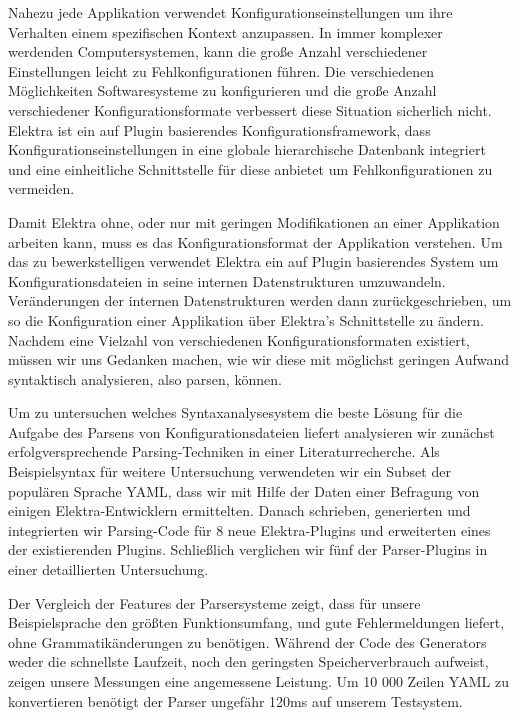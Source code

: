 \begin{kurzfassung}
\begin{sloppypar}
Nahezu jede Applikation verwendet Konfigurationseinstellungen um ihre Verhalten einem spezifischen Kontext anzupassen. In immer komplexer werdenden Computersystemen, kann die große Anzahl verschiedener Einstellungen leicht zu Fehlkonfigurationen führen. Die verschiedenen Möglichkeiten Softwaresysteme zu konfigurieren und die große Anzahl verschiedener Konfigurationsformate verbessert diese Situation sicherlich nicht. Elektra ist ein auf Plugin basierendes Konfigurationsframework, dass Konfigurationseinstellungen in eine globale hierarchische Datenbank integriert und eine einheitliche Schnittstelle für diese anbietet um Fehlkonfigurationen zu vermeiden.
\end{sloppypar}

Damit Elektra ohne, oder nur mit geringen Modifikationen an einer Applikation arbeiten kann, muss es das Konfigurationsformat der Applikation verstehen. Um das zu bewerkstelligen verwendet Elektra ein auf Plugin basierendes System um Konfigurationsdateien in seine internen Datenstrukturen umzuwandeln. Veränderungen der internen Datenstrukturen werden dann zurückgeschrieben, um so die Konfiguration einer Applikation über Elektra’s Schnittstelle zu ändern. Nachdem eine Vielzahl von verschiedenen Konfigurationsformaten existiert, müssen wir uns Gedanken machen, wie wir diese mit möglichst geringen Aufwand syntaktisch analysieren, also parsen, können.

\begin{sloppypar}
Um zu untersuchen welches Syntaxanalysesystem die beste Lösung für die Aufgabe des Parsens von Konfigurationsdateien liefert analysieren wir zunächst  erfolgversprechende Parsing-Techniken in einer Literaturrecherche. Als Beispielsyntax für weitere Untersuchung verwendeten wir ein Subset der populären Sprache YAML, dass wir mit Hilfe der Daten einer Befragung von einigen Elektra-Entwicklern ermittelten. Danach schrieben, generierten und integrierten wir Parsing-Code für 8 neue Elektra-Plugins und erweiterten eines der existierenden Plugins. Schließlich verglichen wir fünf der Parser-Plugins in einer detaillierten Untersuchung.
\end{sloppypar}

Der Vergleich der Features der Parsersysteme zeigt, dass für unsere Beispielsprache  den größten Funktionsumfang, und gute Fehlermeldungen liefert, ohne Grammatikänderungen zu benötigen. Während der Code des Generators weder die schnellste Laufzeit, noch den geringsten Speicherverbrauch aufweist, zeigen unsere Messungen eine angemessene Leistung. Um 10 000 Zeilen YAML zu konvertieren benötigt der Parser ungefähr 120ms auf unserem Testsystem.
\end{kurzfassung}
